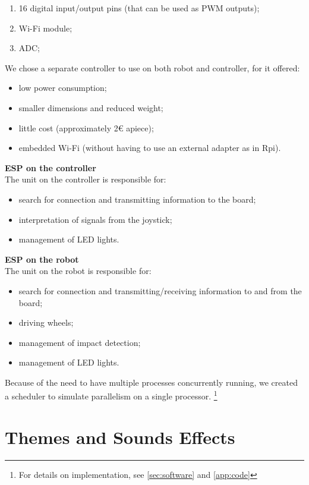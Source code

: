 \documentclass[a4paper,twoside]{book}
\begin{document}
\begin{appendices}
\begin{enumerate}
\item 16 digital input/output pins (that can be used as PWM outputs);
\item Wi-Fi module;
\item ADC; 
\end{enumerate}
We chose a separate controller to use on both robot and controller, for it offered:
\begin{itemize}
\item low power consumption; 
\item smaller dimensions and reduced weight;
\item little cost (approximately 2\euro{} apiece);
\item embedded Wi-Fi (without having to use an external adapter as in Rpi).
\end{itemize}
\textbf{ESP on the controller} 
\\
The unit on the controller is responsible for:
\begin{itemize}
\item search for connection and transmitting information to the board;
\item interpretation of signals from the joystick;
\item management of LED lights.
\end{itemize}
\textbf{ESP on the robot} 
\\
The unit on the robot is responsible for:
\begin{itemize}
\item search for connection and transmitting/receiving information to and from the board;
\item driving wheels;
\item management of impact detection;
\item management of LED lights.
\end{itemize}
Because of the need to have multiple processes concurrently running, we created a scheduler to simulate parallelism on a single processor. 
\footnote {For details on implementation, see \autoref{sec:software} and \autoref{app:code}}

\section{Themes and Sounds Effects}
\label{app:noise}


\end{appendices}
\end{document}
